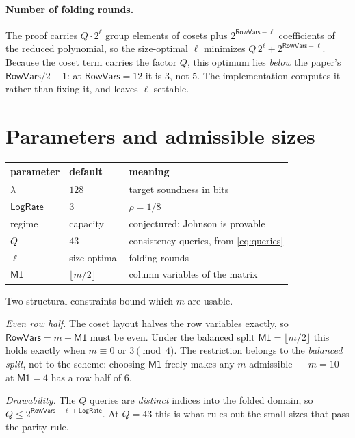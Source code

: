 \documentclass[11pt,a4paper]{article}
\theoremstyle{definition}
\begin{document}
\paragraph{Number of folding rounds.}
The proof carries $Q \cdot 2^{\ell}$ group elements of cosets plus
$2^{\mathsf{RowVars}-\ell}$ coefficients of the reduced polynomial, so the size-optimal
$\ell$ minimizes $Q\,2^{\ell} + 2^{\mathsf{RowVars}-\ell}$. Because the coset term
carries the factor $Q$, this optimum lies \emph{below} the paper's
$\mathsf{RowVars}/2 - 1$: at $\mathsf{RowVars} = 12$ it is $3$, not $5$. The
implementation computes it rather than fixing it, and leaves $\ell$ settable.

\section{Parameters and admissible sizes}

\begin{center}
\begin{tabular}{@{}lll@{}}
\toprule
parameter & default & meaning \\
\midrule
$\lambda$              & $128$          & target soundness in bits \\
$\mathsf{LogRate}$     & $3$            & $\rho = 1/8$ \\
regime                 & capacity       & conjectured; Johnson is provable \\
$Q$                    & $43$           & consistency queries, from \eqref{eq:queries} \\
$\ell$                 & size-optimal   & folding rounds \\
$\mathsf{M1}$          & $\lfloor m/2 \rfloor$ & column variables of the matrix \\
\bottomrule
\end{tabular}
\end{center}

Two structural constraints bound which $m$ are usable.

\emph{Even row half.} The coset layout halves the row variables exactly, so
$\mathsf{RowVars} = m - \mathsf{M1}$ must be even. Under the balanced split
$\mathsf{M1} = \lfloor m/2 \rfloor$ this holds exactly when
$m \equiv 0$ or $3 \pmod 4$. The restriction belongs to the \emph{balanced split}, not
to the scheme: choosing $\mathsf{M1}$ freely makes any $m$ admissible --- $m = 10$ at
$\mathsf{M1} = 4$ has a row half of $6$.

\emph{Drawability.} The $Q$ queries are \emph{distinct} indices into the folded domain,
so $Q \le 2^{\mathsf{RowVars} - \ell + \mathsf{LogRate}}$. At $Q = 43$ this is what
rules out the small sizes that pass the parity rule.
\end{document}
